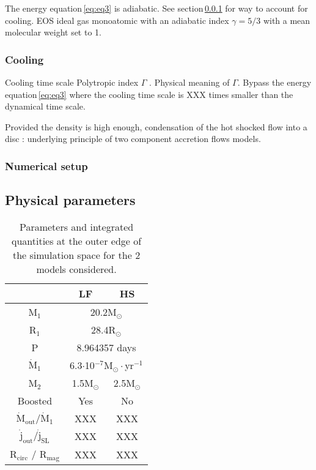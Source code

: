 \documentclass[a4paper,fleqn,usenatbib]{article}
\begin{document}
The energy equation\,\ref{eq:eq3} is adiabatic. See section\,\ref{sec:cool} for way to account for cooling.
EOS ideal gas monoatomic with an adiabatic index $\gamma=5/3$ with a mean molecular weight set to 1. 



\subsubsection{Cooling}
\label{sec:cool}

Cooling time scale \citep{Schure2009}
Polytropic index $\Gamma$ \citep{Horedt2000}. Physical meaning of $\Gamma$. Bypass the energy equation\,\ref{eq:eq3} where the cooling time scale is XXX times smaller than the dynamical time scale.

Provided the density is high enough, condensation of the hot shocked flow into a disc \citep[][and references therein]{Taam2018} : underlying principle of two component accretion flows models.

\subsubsection{Numerical setup}
\label{sec:num_set}

\subsection{Physical parameters}
\label{sec:params}

\begin{table}
\centering
\caption{Parameters and integrated quantities at the outer edge of the simulation space for the 2 models considered.}
\label{tab:params}
\begin{tabularx}{\linewidth}{c|c|c}
   & LF & HS \\
  \hline
  M$_1$ & \multicolumn{2}{c}{20.2M$_{\odot}$} \\
  R$_1$ & \multicolumn{2}{c}{28.4R$_{\odot}$} \\
  P & \multicolumn{2}{c}{8.964357 days} \\  
  $\dot{\text{M}}_1$ & \multicolumn{2}{c}{6.3$\cdot$10$^{-7}$M$_{\odot}\cdot$yr$^{-1}$} \\
  \hline
  M$_2$ & 1.5M$_{\odot}$  & 2.5M$_{\odot}$  \\
  Boosted & Yes & No  \\
  \hline
  $\dot{\text{M}}_{\text{out}}/\dot{\text{M}}_1$ & XXX & XXX  \\
  $\dot{\text{j}}_{\text{out}}/\dot{\text{j}}_{\text{SL}}$ & XXX & XXX \\
  R$_{\text{circ}}$ / R$_{\text{mag}}$ & XXX & XXX \\
\end{tabularx}
\end{table}
\end{document}
